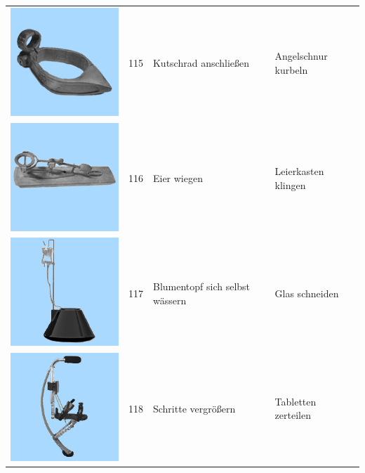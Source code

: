 \documentclass[
  english,
  man,floatsintext]{apa7}
\begin{document}
\begin{center}
\begin{ThreePartTable}
\begin{longtable}{llll}
\includegraphics[valign=c, scale=0.19]{../materials/unfamiliar/115.png} & 115 & Kutschrad anschließen & Angelschnur kurbeln\\
\includegraphics[valign=c, scale=0.19]{../materials/unfamiliar/116.png} & 116 & Eier wiegen & Leierkasten klingen\\
\includegraphics[valign=c, scale=0.19]{../materials/unfamiliar/117.png} & 117 & Blumentopf sich selbst wässern & Glas schneiden\\
\includegraphics[valign=c, scale=0.19]{../materials/unfamiliar/118.png} & 118 & Schritte vergrößern & Tabletten zerteilen\\

\end{longtable}
\end{ThreePartTable}
\end{center}
\end{document}
